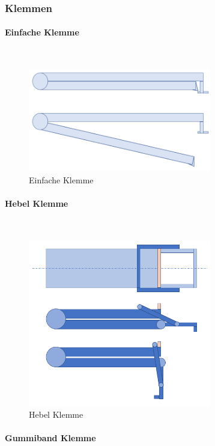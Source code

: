 \documentclass[a4paper,12pt]{scrartcl}
\begin{document}
\subsubsection{Klemmen}
\paragraph{Einfache Klemme}$~~$\\ 

\begin{figure}[H]
\begin{center}
\includegraphics[width=8cm]{Bilder/Powerpoint/Einfach_Klemme}
\caption{Einfache Klemme}
\end{center}
\end{figure}

\paragraph{Hebel Klemme}$~~$\\ 

\begin{figure}[H]
\begin{center}
\includegraphics[width=8cm]{Bilder/Powerpoint/Hebel_Klemme}
\caption{Hebel Klemme}
\end{center}
\end{figure}

\paragraph{Gummiband Klemme}$~~$\\ 
\end{document}
